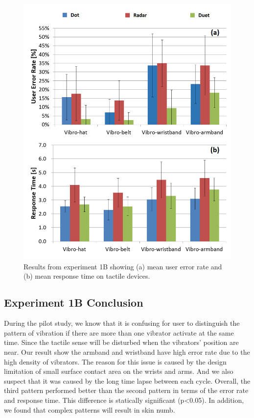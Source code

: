 \documentclass{sigchi}
\begin{document}
\begin{figure}[!t]
\centering
\includegraphics[width=0.9\columnwidth]{stage1_Vibro_ER&RT}
\caption{Results from experiment 1B showing (a) mean user error rate and (b) mean response time on tactile devices.}
\label{fig:vibro_ER&RT}
\end{figure}

\subsection{Experiment 1B Conclusion}
During the pilot study, we know that it is confusing for user to distinguish the pattern of vibration if there are more than one vibrator activate at the same time. Since the tactile sense will be disturbed when the vibrators' position are near. Our result show the armband and wristband have high error rate due to the high density of vibrators. The reason for this issue is caused by the design limitation of small surface contact area on the wrists and arms. And we also suspect that it was caused by the long time lapse between each cycle. Overall, the third pattern performed better than the second pattern in terms of the error rate and response time. This difference is statically significant (p\textless0.05). In addition, we found that complex patterns will result in skin numb.
\end{document}
